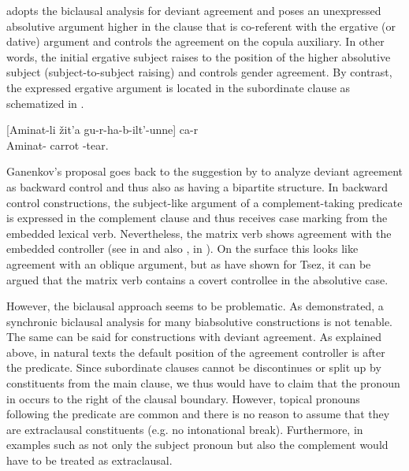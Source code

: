 \citet{GanenkovForthcoming} adopts the biclausal analysis for deviant agreement and poses an unexpressed absolutive argument higher in the clause that is co-referent with the ergative (or dative) argument and controls the agreement on the copula auxiliary. In other words, the initial ergative subject raises to the position of the higher absolutive subject (subject-to-subject raising) and controls gender agreement. By contrast, the expressed ergative argument is located in the subordinate clause as schematized in . 

\begin{exe}
	\ex	\label{ex:Aminat is tearing out a carrot from}
	\gll	 \textunderscore\raisebox{-.4ex}{\scriptsize i}\emph{}	[Aminat-li\raisebox{-.4ex}{\scriptsize i}	žit'a	gu-r-ha-b-ilt'-unne]	ca-r\\
		{} Aminat-	carrot	-tear.  \\
	\glt	{}
\end{exe}

Ganenkov's proposal goes back to the suggestion by \citet{Sumbatova2010} to analyze deviant agreement as backward control and thus also as having a bipartite structure. In backward control constructions, the subject-like argument of a complement-taking predicate is expressed in the complement clause and thus receives case marking from the embedded lexical verb. Nevertheless, the matrix verb shows agreement with the embedded controller (see  in  and also ,  in ). On the surface this looks like agreement with an oblique argument, but as \citet{Polinsky.Potsdam2002, Polinsky.Potsdam2006} have shown for Tsez, it can be argued that the matrix verb contains a covert controllee in the absolutive case.

However, the biclausal approach seems to be problematic. As \citet{Forker2012a} demonstrated, a synchronic biclausal analysis for many biabsolutive constructions is not tenable. The same can be said for constructions with deviant agreement. As explained above, in natural texts the default position of the agreement controller is after the predicate. Since subordinate clauses cannot be discontinues or split up by constituents from the main clause, we thus would have to claim that the pronoun in  occurs to the right of the clausal boundary. However, topical pronouns following the predicate are common and there is no reason to assume that they are extraclausal constituents (e.g. no intonational break). Furthermore, in examples such as  not only the subject pronoun but also the complement would have to be treated as extraclausal. 

